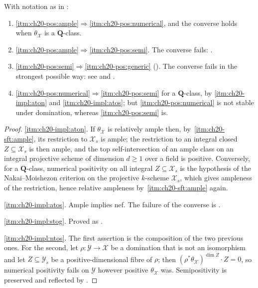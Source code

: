 \begin{theorem}
\label{thm:ch20-positivity-implications}
With notation as in :
\begin{enumerate}
\item\label{itm:ch20-impl:aton}
 \cref{itm:ch20-pos:ample}\(\Rightarrow\)\cref{itm:ch20-pos:numerical}, and
 the converse holds when \(\theta_{\mathcal X}\) is a
 \(\mathbf Q\)-class.
\item\label{itm:ch20-impl:atos}
 \cref{itm:ch20-pos:ample}\(\Rightarrow\)\cref{itm:ch20-pos:semi}.  The
 converse fails: .
\item\label{itm:ch20-impl:stog}
 \cref{itm:ch20-pos:semi}\(\Rightarrow\)\cref{itm:ch20-pos:generic}
 \textup{()}.  The converse fails
 in the strongest possible way: see
  and
 .
\item\label{itm:ch20-impl:ntos}
 \cref{itm:ch20-pos:numerical}\(\Rightarrow\)\cref{itm:ch20-pos:semi}
 for a \(\mathbf Q\)-class, by \cref{itm:ch20-impl:aton} and
 \cref{itm:ch20-impl:atos}; but \cref{itm:ch20-pos:numerical} is not stable
 under domination, whereas \cref{itm:ch20-pos:semi} is.
\end{enumerate}
\end{theorem}

\begin{proof}
\cref{itm:ch20-impl:aton}.  If \(\theta_{\mathcal X}\) is relatively ample
then, by
\,\cref{itm:ch20-sft:ample}, its
restriction to \(\mathcal X_s\) is ample; the restriction to an integral
closed \(Z\subseteq\mathcal X_s\) is then ample, and the top
self-intersection of an ample class on an integral projective scheme of
dimension \(d\geq1\) over a field is positive.  Conversely, for a
\(\mathbf Q\)-class, numerical positivity on all integral
\(Z\subseteq\mathcal X_s\) is the hypothesis of the Nakai--Moishezon
criterion on the projective \(k\)-scheme \(\mathcal X_s\), which gives
ampleness of the restriction, hence relative ampleness by
\,\cref{itm:ch20-sft:ample} again.

\cref{itm:ch20-impl:atos}.  Ample implies nef.  The failure of the converse
is .

\cref{itm:ch20-impl:stog}.  Proved as
.

\cref{itm:ch20-impl:ntos}.  The first assertion is the composition of the
two previous ones.  For the second, let \(\rho:\mathcal Y\to\mathcal X\) be
a domination that is not an isomorphism and let \(Z\subseteq\mathcal Y_s\)
be a positive-dimensional fibre of \(\rho\); then
\((\rho^*\theta_{\mathcal X})^{\dim Z}\cdot Z=0\), so numerical positivity
fails on \(\mathcal Y\) however positive \(\theta_{\mathcal X}\) was.
Semipositivity is preserved and reflected by
.
\end{proof}

